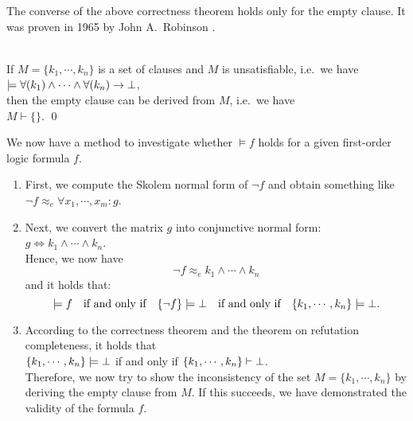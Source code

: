 \noindent
The converse of the above correctness theorem holds only for the empty clause. It was proven in 1965 by John
A.~Robinson \cite{robinson:1965}. 
\begin{Satz}
   \hspace*{\fill} \\
  If $M = \{k_1,\cdots,k_n\}$ is a set of clauses and $M$ is unsatisfiable, i.e.~we have
  \\[0.2cm]
  \hspace*{1.3cm}
  $\models \forall(k_1) \wedge \cdots \wedge \forall(k_n) \rightarrow \bot$, 
  \\[0.2cm]
  then the empty clause can be derived from $M$, i.e.~we have
  \\[0.2cm]
  \hspace*{1.3cm} $M \vdash \{\}$.     \qed
\end{Satz}

\noindent
We now have a method to investigate whether $\models f$ holds for a given first-order logic formula $f$.
\begin{enumerate}
\item First, we compute the Skolem normal form of $\neg f$ and obtain something like \\[0.2cm]
      \hspace*{1.3cm} $\neg f \approx_e \forall x_1, \cdots, x_m \colon g$.
\item Next, we convert the matrix $g$ into conjunctive normal form: 
      \\[0.2cm]
      \hspace*{1.3cm}
    $g \Leftrightarrow k_1 \wedge \cdots \wedge k_n$.
      \\[0.2cm]
      Hence, we now have 
      \[ \neg f \approx_e k_1 \wedge \cdots \wedge k_n \] 
      and it holds that: 
      \[  
          \models f \quad \mbox{if and only if} \quad
          \{\neg f\} \models \bot \quad \mbox{if and only if} \quad 
          \{k_1,\cdots,k_n\} \models \bot.
      \]
\item According to the correctness theorem and the theorem on refutation completeness, it holds that
      \\[0.2cm]
      \hspace*{1.3cm} 
      $\{k_1,\cdots,k_n\} \models \bot$ \quad if and only if \quad 
      $\{k_1,\cdots,k_n\} \vdash \bot$. \\[0.2cm]
      Therefore, we now try to show the inconsistency of the set $M = \{ k_1, \cdots, k_n \}$ by deriving the empty clause from $M$.
      If this succeeds, we have demonstrated the validity of the formula $f$.
\end{enumerate}

